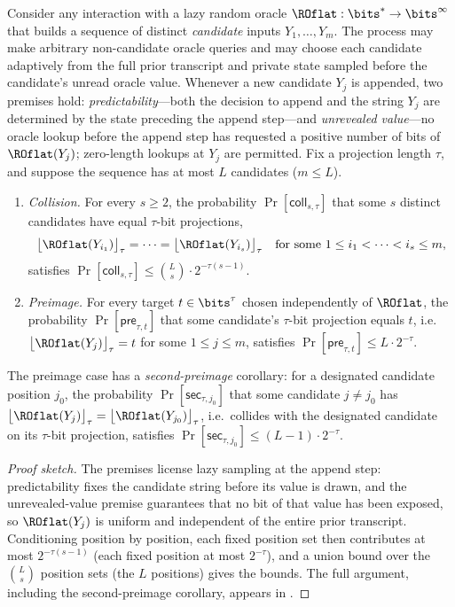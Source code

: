 \begin{lemma}
\label{lem:adaptive-candidate}
Consider any interaction with a lazy random oracle $\ROflat : \bits^* \to
\bits^\infty$ that builds a sequence of distinct \emph{candidate} inputs
$Y_1,\dots,Y_m$. The process may make arbitrary non-candidate oracle
queries and may choose each candidate adaptively from the full prior
transcript and private state sampled before the candidate's unread oracle
value. Whenever a new candidate $Y_j$ is appended, two premises hold:
\emph{predictability}---both the decision to append and the string $Y_j$
are determined by the state preceding the append step---and
\emph{unrevealed value}---no oracle lookup before the append step has
requested a positive number of bits of $\ROflat(Y_j)$; zero-length lookups
at $Y_j$ are permitted. Fix a projection length $\tau$, and suppose the
sequence has at most $L$ candidates ($m \leq L$).
\begin{enumerate}
\item \emph{Collision.} For every $s \geq 2$, the
  probability $\Pr[\mathsf{coll}_{s,\tau}]$ that some $s$ distinct
  candidates have equal $\tau$-bit projections,
  \[
    \bigl\lfloor \ROflat(Y_{i_1}) \bigr\rfloor_\tau = \cdots =
    \bigl\lfloor \ROflat(Y_{i_s}) \bigr\rfloor_\tau
    \quad \text{for some } 1 \leq i_1 < \cdots < i_s \leq m,
  \]
  satisfies
  $\Pr[\mathsf{coll}_{s,\tau}] \leq \binom{L}{s} \cdot 2^{-\tau(s-1)}$.
\item \emph{Preimage.} For every target $t \in \bits^\tau$ chosen
  independently of $\ROflat$, the probability
  $\Pr[\mathsf{pre}_{\tau,t}]$ that some candidate's $\tau$-bit projection
  equals $t$, i.e.\ $\bigl\lfloor \ROflat(Y_j) \bigr\rfloor_\tau = t$ for
  some $1 \leq j \leq m$, satisfies
  $\Pr[\mathsf{pre}_{\tau,t}] \leq L \cdot 2^{-\tau}$.
\end{enumerate}
The preimage case has a \emph{second-preimage} corollary: for a
designated candidate position $j_0$, the probability
$\Pr[\mathsf{sec}_{\tau,j_0}]$ that some candidate $j \neq j_0$ has
$\bigl\lfloor \ROflat(Y_j) \bigr\rfloor_\tau =
 \bigl\lfloor \ROflat(Y_{j_0}) \bigr\rfloor_\tau$, i.e.\ collides with the
designated candidate on its $\tau$-bit projection, satisfies
$\Pr[\mathsf{sec}_{\tau,j_0}] \leq (L-1) \cdot 2^{-\tau}$.
\end{lemma}

\begin{proof}[Proof sketch]
The premises license lazy sampling at the append step: predictability
fixes the candidate string before its value is drawn, and the
unrevealed-value premise guarantees that no bit of that value has been
exposed, so $\ROflat(Y_j)$ is uniform and independent of the entire prior
transcript. Conditioning position by position, each fixed position set
then contributes at most $2^{-\tau(s-1)}$ (each fixed position at most
$2^{-\tau}$), and a union bound over the $\binom{L}{s}$ position sets
(the $L$ positions) gives the bounds. The full argument, including the
second-preimage corollary, appears in
.
\end{proof}

